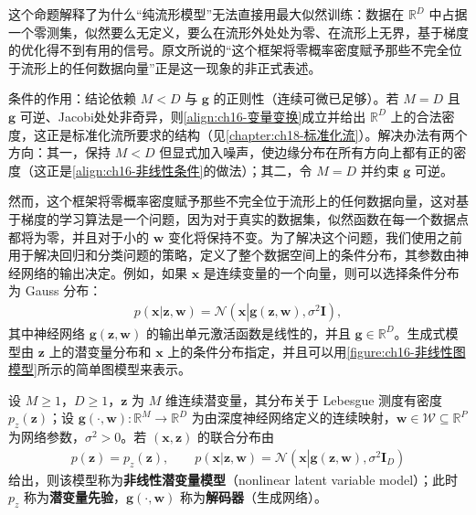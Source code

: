 \documentclass[../../main.tex]{subfiles}
\begin{document}
\begin{remark}
这个命题解释了为什么“纯流形模型”无法直接用最大似然训练：数据在 $\mathbb{R}^{D}$ 中占据一个零测集，似然要么无定义，要么在流形外处处为零、在流形上无界，基于梯度的优化得不到有用的信号。原文所说的“这个框架将零概率密度赋予那些不完全位于流形上的任何数据向量”正是这一现象的非正式表述。

条件的作用：结论依赖 $M<D$ 与 $\bm{g}$ 的正则性（连续可微已足够）。若 $M=D$ 且 $\bm{g}$ 可逆、Jacobi处处非奇异，则\eqref{align:ch16-变量变换}成立并给出 $\mathbb{R}^{D}$ 上的合法密度，这正是标准化流所要求的结构（见\cref{chapter:ch18-标准化流}）。解决办法有两个方向：其一，保持 $M<D$ 但显式加入噪声，使边缘分布在所有方向上都有正的密度（这正是\eqref{align:ch16-非线性条件}的做法）；其二，令 $M=D$ 并约束 $\bm{g}$ 可逆。
\end{remark}

然而，这个框架将零概率密度赋予那些不完全位于流形上的任何数据向量，这对基于梯度的学习算法是一个问题，因为对于真实的数据集，似然函数在每一个数据点都将为零，并且对于小的 $\bm{w}$ 变化将保持不变。为了解决这个问题，我们使用之前用于解决回归和分类问题的策略，定义了整个数据空间上的条件分布，其参数由神经网络的输出决定。例如，如果 $\bm{x}$ 是连续变量的一个向量，则可以选择条件分布为 Gauss 分布：
\begin{align}
  p(\bm{x}|\bm{z},\bm{w})=\mathcal{N}\left(\bm{x}\left|\bm{g}(\bm{z},\bm{w}),\sigma^2\bm{I}\right.\right),
  \label{align:ch16-非线性条件}
\end{align}
其中神经网络 $\bm{g}(\bm{z},\bm{w})$ 的输出单元激活函数是线性的，并且 $\bm{g}\in\mathbb{R}^{D}$。生成式模型由 $\bm{z}$ 上的潜变量分布和 $\bm{x}$ 上的条件分布指定，并且可以用\cref{figure:ch16-非线性图模型}所示的简单图模型来表示。

\begin{definition}[非线性潜变量模型]\label{definition:ch16-非线性潜变量模型}
设 $M\geqslant1$，$D\geqslant1$，$\bm{z}$ 为 $M$ 维连续潜变量，其分布关于 Lebesgue 测度有密度 $p_z(\bm{z})$；设 $\bm{g}(\cdot,\bm{w}):\mathbb{R}^{M}\to\mathbb{R}^{D}$ 为由深度神经网络定义的连续映射，$\bm{w}\in\mathcal{W}\subseteq\mathbb{R}^{P}$ 为网络参数，$\sigma^2>0$。若 $(\bm{x},\bm{z})$ 的联合分布由
\begin{align*}
  p(\bm{z})=p_z(\bm{z}),\qquad
  p(\bm{x}|\bm{z},\bm{w})=\mathcal{N}\left(\bm{x}\left|\bm{g}(\bm{z},\bm{w}),\sigma^2\bm{I}_D\right.\right)
\end{align*}
给出，则该模型称为\textbf{非线性潜变量模型}（nonlinear latent variable model）；此时 $p_z$ 称为\textbf{潜变量先验}，$\bm{g}(\cdot,\bm{w})$ 称为\textbf{解码器}（生成网络）。
\end{definition}
\end{document}

